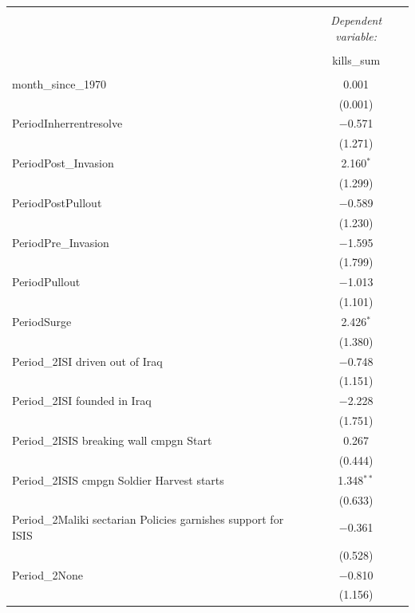 \begin{table}[ht] \centering 
  \label{tab:negbin} 
  \begin{adjustbox}{width=1\textwidth}
\small 
\begin{tabular}{@{\extracolsep{5pt}}lc} 
\\[-1.8ex]\hline 
\hline \\[-1.8ex] 
 & \multicolumn{1}{c}{\textit{Dependent variable:}} \\ 
\cline{2-2} 
\\[-1.8ex] & kills\_sum \\ 
\hline \\[-1.8ex] 
 month\_since\_1970 & 0.001 \\ 
  & (0.001) \\ 
 PeriodInherrentresolve & $-$0.571 \\ 
  & (1.271) \\ 
 PeriodPost\_Invasion & 2.160$^{*}$ \\ 
  & (1.299) \\ 
 PeriodPostPullout & $-$0.589 \\ 
  & (1.230) \\ 
 PeriodPre\_Invasion & $-$1.595 \\ 
  & (1.799) \\ 
 PeriodPullout & $-$1.013 \\ 
  & (1.101) \\ 
 PeriodSurge & 2.426$^{*}$ \\ 
  & (1.380) \\ 
 Period\_2ISI driven out of Iraq & $-$0.748 \\ 
  & (1.151) \\ 
 Period\_2ISI founded in Iraq & $-$2.228 \\ 
  & (1.751) \\ 
 Period\_2ISIS breaking wall cmpgn Start & 0.267 \\ 
  & (0.444) \\ 
 Period\_2ISIS cmpgn Soldier Harvest starts & 1.348$^{**}$ \\ 
  & (0.633) \\ 
 Period\_2Maliki sectarian Policies garnishes support for ISIS & $-$0.361 \\ 
  & (0.528) \\ 
 Period\_2None & $-$0.810 \\ 
  & (1.156) \\ 

\end{tabular}
\end{adjustbox}
\end{table}
